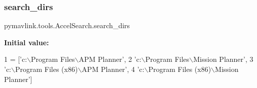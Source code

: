 \subsubsection{\texorpdfstring{search\+\_\+dirs}{search\_dirs}}
{\footnotesize\ttfamily pymavlink.\+tools.\+Accel\+Search.\+search\+\_\+dirs}

{\bfseries Initial value\+:}
\begin{DoxyCode}
1 =  [\textcolor{stringliteral}{'c:\(\backslash\)Program Files\(\backslash\)APM Planner'},
2                \textcolor{stringliteral}{'c:\(\backslash\)Program Files\(\backslash\)Mission Planner'},
3                \textcolor{stringliteral}{'c:\(\backslash\)Program Files (x86)\(\backslash\)APM Planner'},
4                \textcolor{stringliteral}{'c:\(\backslash\)Program Files (x86)\(\backslash\)Mission Planner'}]
\end{DoxyCode}
